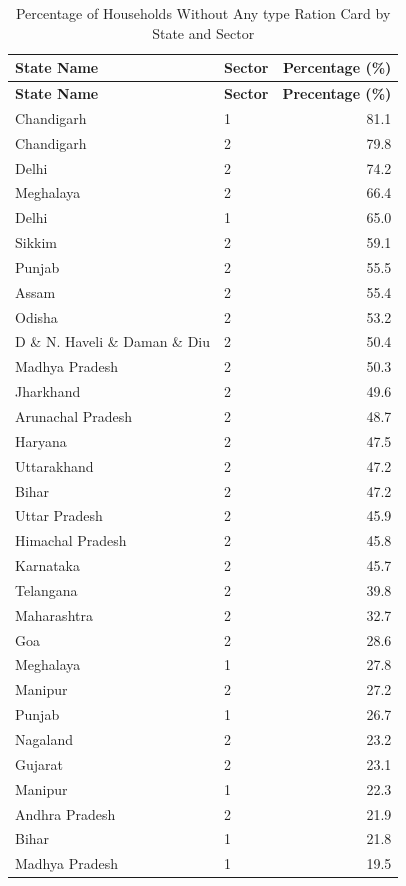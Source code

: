 \documentclass{article}
\begin{document}
\begin{longtable}{llr}
	\caption{Percentage of Households Without Any type  Ration Card by State and Sector} \\
	\toprule
	\textbf{State Name} & \textbf{Sector} & \textbf{Percentage (\%)} \\
	\midrule
	\endfirsthead
	
	\toprule
	\textbf{State Name} & \textbf{Sector} & \textbf{Precentage (\%)} \\
	\midrule
	\endhead
	
	\bottomrule
	\endfoot
	Chandigarh & 1 & 81.1 \\
	Chandigarh & 2 & 79.8 \\
	Delhi & 2 & 74.2 \\
	Meghalaya & 2 & 66.4 \\
	Delhi & 1 & 65.0 \\
	Sikkim & 2 & 59.1 \\
	Punjab & 2 & 55.5 \\
	Assam & 2 & 55.4 \\
	Odisha & 2 & 53.2 \\
	D \& N. Haveli \& Daman \& Diu & 2 & 50.4 \\
	Madhya Pradesh & 2 & 50.3 \\
	Jharkhand & 2 & 49.6 \\
	Arunachal Pradesh & 2 & 48.7 \\
	Haryana & 2 & 47.5 \\
	Uttarakhand & 2 & 47.2 \\
	Bihar & 2 & 47.2 \\
	Uttar Pradesh & 2 & 45.9 \\
	Himachal Pradesh & 2 & 45.8 \\
	Karnataka & 2 & 45.7 \\
	Telangana & 2 & 39.8 \\
	Maharashtra & 2 & 32.7 \\
	Goa & 2 & 28.6 \\
	Meghalaya & 1 & 27.8 \\
	Manipur & 2 & 27.2 \\
	Punjab & 1 & 26.7 \\
	Nagaland & 2 & 23.2 \\
	Gujarat & 2 & 23.1 \\
	Manipur & 1 & 22.3 \\
	Andhra Pradesh & 2 & 21.9 \\
	Bihar & 1 & 21.8 \\
	Madhya Pradesh & 1 & 19.5 \\

\end{longtable}
\end{document}
